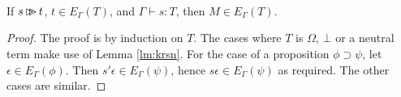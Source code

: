 {\begin{code}
\\
%
\\
\>  \AgdaSymbol{:}  \AgdaSymbol{\{}\AgdaSymbol{\}} \AgdaSymbol{\{} \AgdaSymbol{:}  \AgdaSymbol{\}} \AgdaSymbol{\{}\AgdaSymbol{\}} \AgdaSymbol{\{} \AgdaSymbol{:}   \AgdaSymbol{\}} \AgdaSymbol{\{} \AgdaSymbol{\}} \<%
\\
\>[4]\<[26]%
\>[26]                   \<%
\end{code}
}

\begin{lm}
\label{lm:expand-compute}
If $s \mathop{\rhd \!\!\! \rhd} t$, $t \in E_\Gamma(T)$, and $\Gamma \vdash s : T$, then $M \in E_\Gamma(T)$.
\end{lm}

\begin{proof}
The proof is by induction on $T$.  The cases where $T$ is $\Omega$, $\bot$ or a neutral term make use of Lemma \ref{lm:krsn}.  For the case of a proposition $\phi \supset \psi$, let $\epsilon \in E_\Gamma(\phi)$.  Then $s' \epsilon \in E_\Gamma(\psi)$, hence $s \epsilon \in E_\Gamma(\psi)$ as required.  The other cases are similar.
\end{proof}

\begin{code}%
\> \AgdaSymbol{:}  \AgdaSymbol{\{}\AgdaSymbol{\}} \AgdaSymbol{\{}\AgdaSymbol{\}} \AgdaSymbol{\{} \AgdaSymbol{:}  \AgdaSymbol{\}} \AgdaSymbol{\{} \AgdaSymbol{:}   \AgdaSymbol{(} \AgdaSymbol{)\}} \AgdaSymbol{\{}  \AgdaSymbol{:}   \AgdaSymbol{(} \AgdaSymbol{)\}} \<%
\\
\>[0]\<[2]%
\>[2]                     \<%
\end{code}

